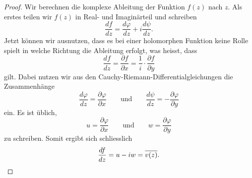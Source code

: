 		\begin{proof}
			\label{joukowski:stroemungslinien:v-konjugiert-komplex}
			Wir berechnen die komplexe Ableitung der Funktion $f(z)$ nach $z$.
			Als erstes teilen wir $f(z)$ in Real- und Imaginärteil und schreiben
			\[
				\frac{df}{dz}
				=
				\frac{d\varphi}{dz} + i \frac{d\psi}{dz}.
			\]
			Jetzt können wir ausnutzen, dass es bei einer holomorphen Funktion keine Rolle spielt in welche Richtung die Ableitung erfolgt,
			was heisst, dass
			\[
				\frac{df}{dz}
				=
				\frac{\partial f}{\partial x}
				=
				\frac{1}{i} \cdot \frac{\partial f}{\partial y}
			\]
			gilt.
			Dabei nutzen wir aus den Cauchy-Riemann-Differentialgleichungen die Zusammenhänge
			\[
				\frac{d\varphi}{dz}
				=
				\frac{\partial \varphi}{\partial x}
				\qquad
				\text{und}
				\qquad
				\frac{d\psi}{dz}
				=
				-\frac{\partial \varphi}{\partial y}
			\]
			ein.
			Es ist üblich,
			\[
				u
				=
				\frac{\partial \varphi}{\partial x}
				\qquad
				\text{und}
				\qquad
				w
				=
				\frac{\partial \varphi}{\partial y}
			\]
			zu schreiben.
			Somit ergibt sich schliesslich
			\[
				\frac{df}{dz}
				=
				u - iw
				=
				\overline{v(z)}. \qedhere
			\]
		\end{proof}
	